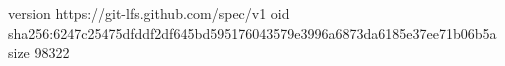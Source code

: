 version https://git-lfs.github.com/spec/v1
oid sha256:6247c25475dfddf2df645bd595176043579e3996a6873da6185e37ee71b06b5a
size 98322
